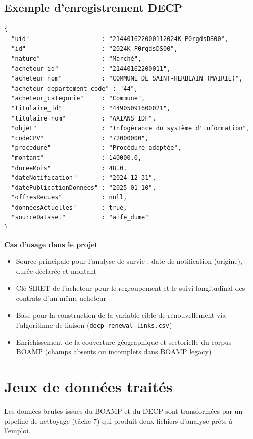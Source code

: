 \documentclass[12pt,a4paper]{article}
\begin{document}
\subsection{Exemple d'enregistrement DECP}

\begin{lstlisting}[language={}]
{
  "uid"                    : "214401622000112024K-P0rgdsDS00",
  "id"                     : "2024K-P0rgdsDS00",
  "nature"                 : "Marché",
  "acheteur_id"            : "21440162200011",
  "acheteur_nom"           : "COMMUNE DE SAINT-HERBLAIN (MAIRIE)",
  "acheteur_departement_code" : "44",
  "acheteur_categorie"     : "Commune",
  "titulaire_id"           : "44905091600021",
  "titulaire_nom"          : "AXIANS IDF",
  "objet"                  : "Infogérance du système d'information",
  "codeCPV"                : "72000000",
  "procedure"              : "Procédure adaptée",
  "montant"                : 140000.0,
  "dureeMois"              : 48.0,
  "dateNotification"       : "2024-12-31",
  "datePublicationDonnees" : "2025-01-10",
  "offresRecues"           : null,
  "donneesActuelles"       : true,
  "sourceDataset"          : "aife_dume"
}
\end{lstlisting}

\medskip
\textbf{Cas d'usage dans le projet}

\begin{itemize}
  \item[---] Source principale pour l'analyse de survie : date de notification
    (origine), durée déclarée et montant
  \item[---] Clé SIRET de l'acheteur pour le regroupement et le suivi
    longitudinal des contrats d'un même acheteur
  \item[---] Base pour la construction de la variable cible de renouvellement
    via l'algorithme de liaison (\texttt{decp\_renewal\_links.csv})
  \item[---] Enrichissement de la couverture géographique et sectorielle du
    corpus BOAMP (champs absents ou incomplets dans BOAMP legacy)
\end{itemize}

\section{Jeux de données traités}

Les données brutes issues du BOAMP et du DECP sont transformées par un pipeline
de nettoyage (tâche 7) qui produit deux fichiers d'analyse prêts à l'emploi.
\end{document}
